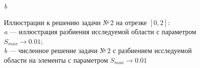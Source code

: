 \documentclass[12pt, a4paper]{article}
\begin{document}
\begin{figure}[h]
\begin{center}
{\begin{minipage}{0.47\textwidth}
							\hspace*{-1.5mm}
							\textit{b} 
						\end{minipage}                                 
					} 
					
				\end{center} 
				\vspace*{-0.0mm} 
				\caption{Иллюстрации к решению задачи №\,2 на отрезке $\left[ 0, 2 \right]$:\\
					\textit{a} --- иллюстрация разбиения исследуемой области с параметром $S_{max} \rightarrow 0.01$; \\
					\textit{b} --- численное решение задачи №\,2 с разбиением исследуемой области на  элементы с параметром $S_{max} \rightarrow 0.01$ \\
				} 
			\end{figure}
			
			
			
						
			\newpage
			
\end{document}
